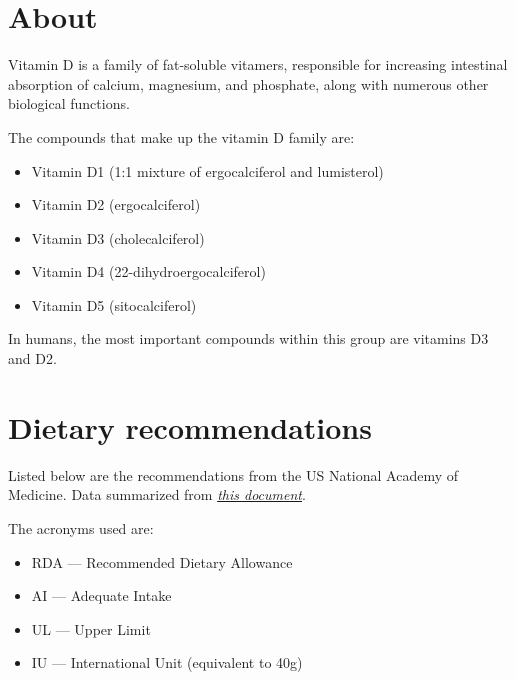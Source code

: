 \documentclass{book}
\begin{document}
\begin{sloppypar}
\section{About}
Vitamin D is a family of fat-soluble vitamers, responsible for increasing intestinal absorption of calcium, magnesium, and phosphate, along with numerous other biological functions.

The compounds that make up the vitamin D family are:
\begin{itemize}
	\item Vitamin D1 (1:1 mixture of ergocalciferol and lumisterol)
	\item Vitamin D2 (ergocalciferol)
	\item Vitamin D3 (cholecalciferol)
	\item Vitamin D4 (22-dihydroergocalciferol)
	\item Vitamin D5 (sitocalciferol)
\end{itemize}

In humans, the most important compounds within this group are vitamins D3 and D2.

\section{Dietary recommendations}
Listed below are the recommendations from the US National Academy of Medicine. Data summarized from \href{https://nap.nationalacademies.org/read/13050/chapter/7}{\textit{this document}}.

The acronyms used are:
\begin{itemize}
	\item RDA --- Recommended Dietary Allowance
	\item AI --- Adequate Intake
	\item UL --- Upper Limit
	\item IU --- International Unit (equivalent to 40g)
\end{itemize}


\end{sloppypar}
\end{document}
